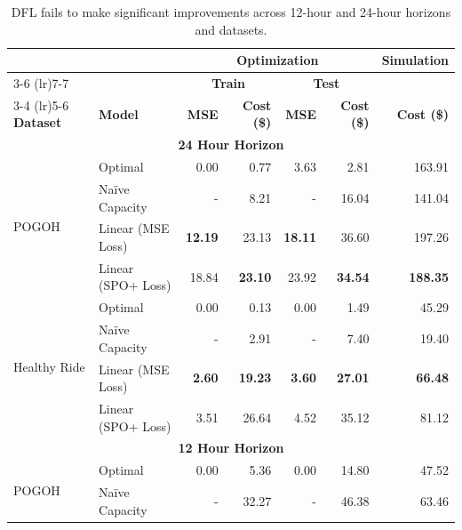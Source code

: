 \documentclass{article}
\begin{document}
\begin{table}[ht]
  \centering
  \small
  \caption{DFL fails to make significant improvements across 12-hour and 24-hour horizons and datasets.}
  \label{tab:optimization_results}
  \begin{tabular}{llrrrrr}
    \toprule
    & & \multicolumn{4}{c}{\textbf{Optimization}} & \textbf{Simulation} \\
    \cmidrule(lr){3-6} \cmidrule(lr){7-7}
    & & \multicolumn{2}{c}{\textbf{Train}} & \multicolumn{2}{c}{\textbf{Test}} & \\
    \cmidrule(lr){3-4} \cmidrule(lr){5-6}
    \textbf{Dataset} & \textbf{Model} & \textbf{MSE} & \textbf{Cost (\$)} & \textbf{MSE} & \textbf{Cost (\$)} & \textbf{Cost (\$)} \\
    \midrule
    \multicolumn{7}{c}{\textbf{24 Hour Horizon}} \\
    \midrule
    \multirow{4}{*}{POGOH} 
    & Optimal             & 0.00           & 0.77           & 3.63           & 2.81           & 163.91 \\
    & Naïve Capacity      & -              & 8.21           & -              & 16.04          & 141.04 \\
    & Linear (MSE Loss)   & \textbf{12.19} & 23.13          & \textbf{18.11} & 36.60          & 197.26 \\
    & Linear (SPO+ Loss)  & 18.84          & \textbf{23.10} & 23.92          & \textbf{34.54} & \textbf{188.35} \\
    \midrule
    \multirow{4}{*}{Healthy Ride} 
    & Optimal             & 0.00           & 0.13           & 0.00           & 1.49           & 45.29 \\
    & Naïve Capacity      & -              & 2.91           & -              & 7.40           & 19.40 \\
    & Linear (MSE Loss)   & \textbf{2.60}  & \textbf{19.23} & \textbf{3.60}  & \textbf{27.01} & \textbf{66.48} \\
    & Linear (SPO+ Loss)  & 3.51           & 26.64          & 4.52           & 35.12          & 81.12 \\
    \midrule
    \multicolumn{7}{c}{\textbf{12 Hour Horizon}} \\
    \midrule
    \multirow{4}{*}{POGOH} 
    & Optimal             & 0.00           & 5.36           & 0.00           & 14.80          & 47.52 \\
    & Naïve Capacity      & -              & 32.27          & -              & 46.38          & 63.46 \\

\end{tabular}
\end{table}
\end{document}
